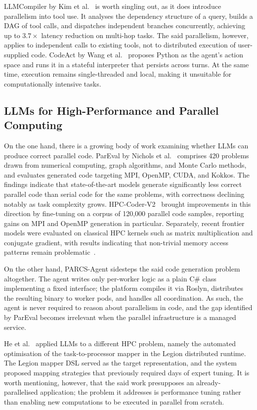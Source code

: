 \documentclass[preprints,article,submit,pdftex,moreauthors]{Definitions/mdpi}
\begin{document}
LLMCompiler by Kim et al.~\citep{ref-llmcompiler} is worth singling out, as it does introduce parallelism into tool use. It analyses the dependency structure of a query, builds a DAG of tool calls, and dispatches independent branches concurrently, achieving up to $3.7\times$ latency reduction on multi-hop tasks. The said parallelism, however, applies to independent calls to existing tools, not to distributed execution of user-supplied code. CodeAct by Wang et al.~\citep{ref-codeact} proposes Python as the agent's action space and runs it in a stateful interpreter that persists across turns. At the same time, execution remains single-threaded and local, making it unsuitable for computationally intensive tasks.

\subsection{LLMs for High-Performance and Parallel Computing}

On the one hand, there is a growing body of work examining whether LLMs can produce correct parallel code. ParEval by Nichols et al.~\citep{ref-pareval} comprises 420 problems drawn from numerical computing, graph algorithms, and Monte Carlo methods, and evaluates generated code targeting MPI, OpenMP, CUDA, and Kokkos. The findings indicate that state-of-the-art models generate significantly less correct parallel code than serial code for the same problems, with correctness declining notably as task complexity grows. HPC-Coder-V2~\citep{ref-hpccoder} brought improvements in this direction by fine-tuning on a corpus of 120{,}000 parallel code samples, reporting gains on MPI and OpenMP generation in particular. Separately, recent frontier models were evaluated on classical HPC kernels such as matrix multiplication and conjugate gradient, with results indicating that non-trivial memory access patterns remain problematic~\citep{ref-deepseekhpc}.

On the other hand, PARCS-Agent sidesteps the said code generation problem altogether. The agent writes only per-worker logic as a plain C\# class implementing a fixed interface; the platform compiles it via Roslyn, distributes the resulting binary to worker pods, and handles all coordination. As such, the agent is never required to reason about parallelism in code, and the gap identified by ParEval becomes irrelevant when the parallel infrastructure is a managed service.

He et al.~\citep{ref-legionllm} applied LLMs to a different HPC problem, namely the automated optimisation of the task-to-processor mapper in the Legion distributed runtime. The Legion mapper DSL served as the target representation, and the system proposed mapping strategies that previously required days of expert tuning. It is worth mentioning, however, that the said work presupposes an already-parallelised application; the problem it addresses is performance tuning rather than enabling new computations to be executed in parallel from scratch.
\end{document}
